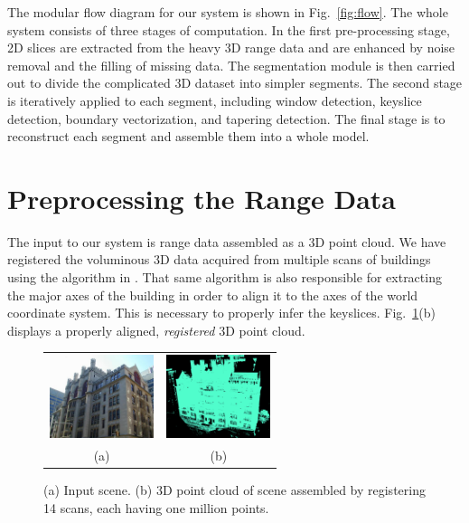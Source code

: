 \documentclass[10pt,twocolumn,letterpaper]{article}
\newcommand{\Fig}[1]{Fig.~\ref{fig:#1}}
\newcommand{\Figb}[1]{Fig.~\ref{fig:#1}(b)}
\begin{document}
The modular flow diagram for our system is shown in \Fig{flow}.
The whole system consists of three stages of computation.
In the first pre-processing stage,
2D slices are extracted from the heavy 3D range data and 
are enhanced by noise removal and the filling of missing data.
The segmentation module is then carried out to divide the complicated
3D dataset into simpler segments.
The second stage is iteratively applied to each segment,
including window detection, keyslice detection, boundary vectorization,
and tapering detection.
The final stage is to reconstruct each segment and assemble them into a
whole model.

\section{Preprocessing the Range Data}
\label{sec:prep}

The input to our system is range data assembled as a 3D point cloud.
We have registered the voluminous 3D data acquired from multiple scans of buildings
using the algorithm in \cite{Stamos08}.
That same algorithm is also responsible for extracting the major axes
of the building in order to align it to the axes of the world coordinate
system.
This is necessary to properly infer the keyslices.
\Figb{IR_2_DXF} displays a properly aligned, {\it registered} 3D point cloud.

\begin{figure}[htbp]
\begin{center}
\begin{tabular}{cc}
	\includegraphics[width=1.2in]{HunterPhoto.jpg} &
	\includegraphics[width=1.2in]{point_cloud.png} \\
	(a) & (b) \\
\end{tabular}
\end{center}
\caption{
(a) Input scene.
(b) 3D point cloud of scene assembled by registering 14 scans, each having
one million points.
}
\label{fig:IR_2_DXF}
\end{figure}
\end{document}
